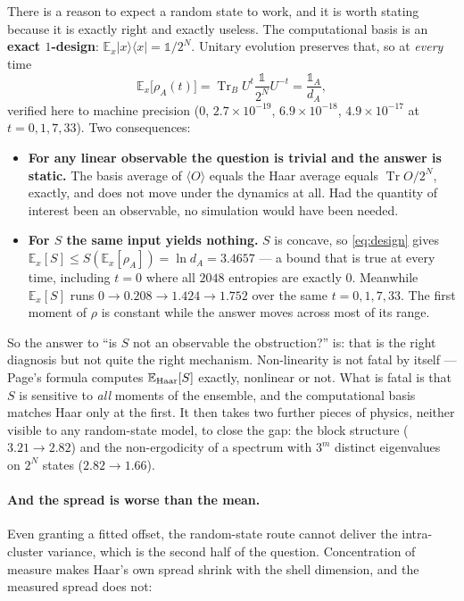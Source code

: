 \documentclass[11pt]{article}
\theoremstyle{plain}
\theoremstyle{definition}
\begin{document}
There is a reason to expect a random state to work, and it is worth stating
because it is exactly right and exactly useless. The computational basis is an
\textbf{exact $1$-design}: $\mathbb{E}_x|x\rangle\langle x|=\mathbb{1}/2^N$.
Unitary evolution preserves that, so at \emph{every} time
\begin{equation}
\mathbb{E}_x\big[\rho_A(t)\big]
 = \operatorname{Tr}_B U^t\frac{\mathbb{1}}{2^N}U^{-t}
 = \frac{\mathbb{1}_A}{d_A},
\label{eq:design}
\end{equation}
verified here to machine precision ($0$, $2.7\times10^{-19}$,
$6.9\times10^{-18}$, $4.9\times10^{-17}$ at $t=0,1,7,33$). Two consequences:

\begin{itemize}
\item \textbf{For any linear observable the question is trivial and the answer is
  static.} The basis average of $\langle O\rangle$ equals the Haar average
  equals $\operatorname{Tr}O/2^N$, exactly, and does not move under the dynamics
  at all. Had the quantity of interest been an observable, no simulation would
  have been needed.
\item \textbf{For $S$ the same input yields nothing.} $S$ is concave, so
  \eqref{eq:design} gives $\mathbb{E}_x[S]\le S(\mathbb{E}_x[\rho_A])=\ln
  d_A=3.4657$ --- a bound that is true at every time, including $t=0$ where all
  $2048$ entropies are exactly $0$. Meanwhile $\mathbb{E}_x[S]$ runs
  $0\to0.208\to1.424\to1.752$ over the same $t=0,1,7,33$. The first moment of
  $\rho$ is constant while the answer moves across most of its range.
\end{itemize}

So the answer to ``is $S$ not an observable the obstruction?'' is: that is the
right diagnosis but not quite the right mechanism. Non-linearity is not fatal by
itself --- Page's formula computes $\mathbb{E}_{\rm Haar}[S]$ exactly, nonlinear
or not. What is fatal is that $S$ is sensitive to \emph{all} moments of the
ensemble, and the computational basis matches Haar only at the first. It then
takes two further pieces of physics, neither visible to any random-state model,
to close the gap: the block structure ($3.21\to2.82$) and the non-ergodicity of
a spectrum with $3^m$ distinct eigenvalues on $2^N$ states ($2.82\to1.66$).

\paragraph{And the spread is worse than the mean.} Even granting a fitted
offset, the random-state route cannot deliver the intra-cluster variance, which
is the second half of the question. Concentration of measure makes Haar's own
spread shrink with the shell dimension, and the measured spread does not:
\end{document}
